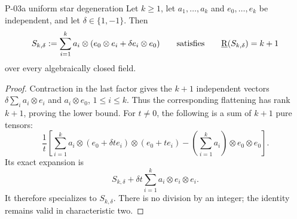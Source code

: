 \begin{finding}{P-03}{a uniform star degeneration}
Let \(k\geq1\), let \(a_1,\ldots,a_k\) and \(e_0,\ldots,e_k\)
be independent, and let \(\delta\in\{1,-1\}\). Then
\[
 S_{k,\delta}:=\sum_{i=1}^k
 a_i\otimes(e_0\otimes e_i+\delta e_i\otimes e_0)
 \qquad\text{satisfies}\qquad
 \underline{\mathrm R}(S_{k,\delta})=k+1
\]
over every algebraically closed field.
\end{finding}
\begin{proof}
Contraction in the last factor gives the \(k+1\) independent
vectors
\(\delta\sum_i a_i\otimes e_i\) and \(a_i\otimes e_0\),
\(1\leq i\leq k\). Thus the corresponding flattening has rank
\(k+1\), proving the lower bound.
For \(t\ne0\), the following is a sum of \(k+1\) pure tensors:
\[
 \frac1t\left[
 \sum_{i=1}^k a_i\otimes(e_0+\delta t e_i)\otimes(e_0+t e_i)
 -\left(\sum_{i=1}^k a_i\right)\otimes e_0\otimes e_0
 \right].
\]
Its exact expansion is
\[
 S_{k,\delta}+\delta t\sum_{i=1}^k a_i\otimes e_i\otimes e_i.
\]
It therefore specializes to \(S_{k,\delta}\). There is no
division by an integer; the identity remains valid in
characteristic two.
\end{proof}

